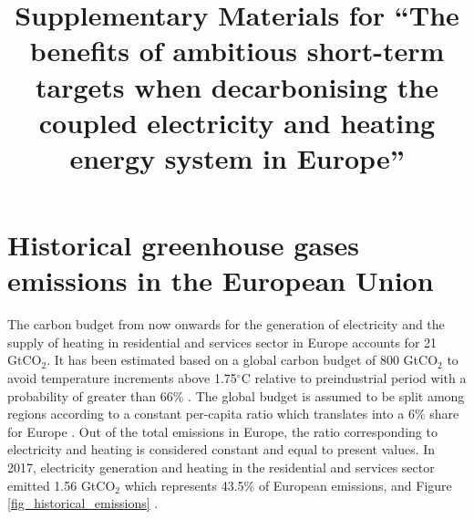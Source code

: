 \documentclass[3p]{elsarticle} %
\begin{document}
\begin{frontmatter}

\title{Supplementary Materials for ``The benefits of ambitious short-term targets when decarbonising the coupled electricity and heating energy system in Europe'' }









\end{frontmatter}

\section{Historical greenhouse gases emissions in the European Union}

The carbon budget from now onwards for the generation of electricity and the supply of heating in residential and services sector in Europe accounts for 21 GtCO$_2$. It has been estimated based on a global carbon budget of 800 GtCO$_2$ to avoid temperature increments above 1.75$^{\circ}$C relative to preindustrial period with a probability of greater than 66\% \cite{IPCC_1.5}. The global budget is assumed to be split among regions according to a constant per-capita ratio which translates into a 6\% share for Europe \cite{Raupach_2014}. Out of the total emissions in Europe, the ratio corresponding to electricity and heating is considered constant and equal to present values. In 2017, electricity generation and heating in the residential and services sector emitted 1.56 GtCO$_2$ which represents 43.5\% of European emissions,  \cite{UNFCCC_inventory} and Figure \ref{fig_historical_emissions} . \\
\end{document}
